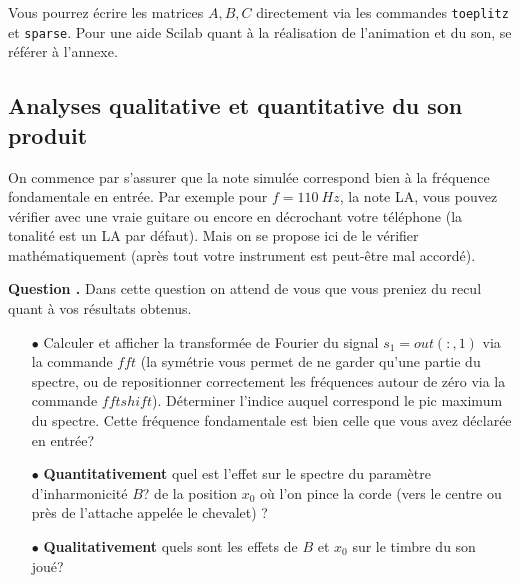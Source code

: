\documentclass[a4,12pt]{article}
\newcounter{Nbquestion}
\newcommand*\question{%
\stepcounter{Nbquestion}%
\textbf{Question \theNbquestion. }}
\begin{document}

Vous pourrez écrire les matrices $A,B,C$ directement via les commandes \verb"toeplitz" et \verb"sparse".
Pour une aide Scilab quant à la réalisation de l'animation et du son, se référer à l'annexe.

\subsection{Analyses qualitative et quantitative du son produit}

On commence par s'assurer que la note simulée correspond bien à la fréquence fondamentale en entrée. Par exemple pour $f=110~Hz$, la note LA, vous pouvez vérifier avec une vraie guitare ou encore en décrochant votre téléphone (la tonalité est un LA par défaut). Mais on se propose ici de le vérifier mathématiquement (après tout votre instrument est peut-être mal accordé). 


\begin{mdframed}[style=exampledefault]
\question Dans cette question on attend de vous que vous preniez du recul quant à vos résultats obtenus.\\

\begin{itemize}
	\item[$\bullet$] Calculer et afficher la transformée de Fourier du signal $s_1=out(:,1)$ via la commande $fft$ 	(la symétrie vous permet de ne garder qu'une partie du spectre, ou de repositionner correctement les 		fréquences autour de zéro via la commande $fftshift$). Déterminer l'indice auquel correspond le pic maximum 	du spectre. Cette fréquence fondamentale est bien celle que vous avez déclarée en entrée?\\ 
	\item[$\bullet$] \textbf{Quantitativement} quel est l'effet sur le spectre du paramètre d'inharmonicité $B$? de 	la position $x_0$ où l'on pince la corde (vers le centre ou près de l'attache appelée le chevalet) ? \\ 
	\item[$\bullet$] \textbf{Qualitativement} quels sont les effets de $B$ et $x_0$ sur le timbre du son joué?\end{itemize} 
\end{mdframed}

\end{document}
